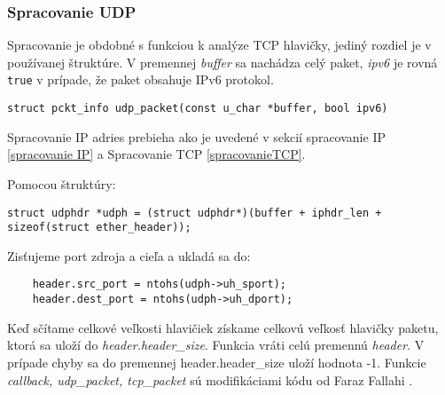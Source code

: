 \documentclass[11pt, a4paper]{article}
\begin{document}
	\subsubsection{Spracovanie UDP}
	Spracovanie je obdobné s funkciou k analýze TCP hlavičky, jediný rozdiel je v používanej štruktúre. V premennej \emph{buffer} sa nachádza celý paket, \emph{ipv6} je rovná \texttt{true} v prípade, že paket obsahuje IPv6 protokol. 
	\begin{lstlisting}
struct pckt_info udp_packet(const u_char *buffer, bool ipv6)
	\end{lstlisting}
	Spracovanie IP adries prebieha ako je uvedené v sekcií spracovanie IP \ref{spracovanie IP} a Spracovanie TCP \ref{spracovanieTCP}.
	
	Pomocou štruktúry: 
	\begin{lstlisting}
struct udphdr *udph = (struct udphdr*)(buffer + iphdr_len + sizeof(struct ether_header));   
	\end{lstlisting}
Zisťujeme port zdroja a cieľa a ukladá sa do:
	\begin{lstlisting}
	header.src_port = ntohs(udph->uh_sport);
	header.dest_port = ntohs(udph->uh_dport);
	\end{lstlisting}
Keď sčítame celkové veľkosti hlavičiek získame celkovú veľkosť hlavičky paketu, ktorá sa uloží do \emph{header.header\_size}. Funkcia vráti celú premennú \emph{header}. V prípade chyby sa do premennej header.header\_size uloží hodnota -1. Funkcie \emph{callback, udp\_packet, tcp\_packet} sú modifikáciami kódu od Faraz Fallahi \cite{FarazFallahi}.
\end{document}
